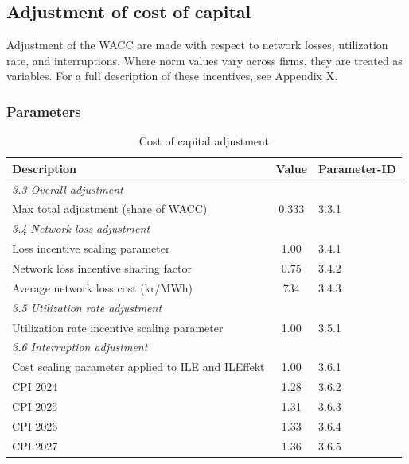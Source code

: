 \subsection{Adjustment of cost of capital}

Adjustment of the WACC are made with respect to network losses, utilization rate, and interruptions.
Where norm values vary across firms, they are treated as variables. For a full description of these incentives, see Appendix X.

\subsubsection{Parameters}

\begin{table}[H]
\centering
\footnotesize
\begin{threeparttable}
\caption{Cost of capital adjustment}
\label{tab:wacc-adj-parameters}
\begin{tabular}{@{}lrrl@{}}
\toprule
\textbf{Description} & \multicolumn{2}{c}{\textbf{Value}} & \textbf{Parameter-ID} \\
\midrule
\multicolumn{4}{l}{\textit{3.3 Overall adjustment}} \\
Max total adjustment (share of WACC)\tnote{a} & \multicolumn{2}{c}{0.333} & 3.3.1 \\
\midrule
\multicolumn{4}{l}{\textit{3.4 Network loss adjustment}} \\
Loss incentive scaling parameter & \multicolumn{2}{c}{1.00} & 3.4.1 \\
Network loss incentive sharing factor\tnote{b} & \multicolumn{2}{c}{0.75} & 3.4.2 \\
Average network loss cost (kr/MWh) & \multicolumn{2}{c}{734} & 3.4.3 \\
\midrule
\multicolumn{4}{l}{\textit{3.5 Utilization rate adjustment}} \\
Utilization rate incentive scaling parameter & \multicolumn{2}{c}{1.00} & 3.5.1 \\
\midrule
\multicolumn{4}{l}{\textit{3.6 Interruption adjustment}} \\
Cost scaling parameter applied to ILE and ILEffekt & \multicolumn{2}{c}{1.00} & 3.6.1 \\
CPI 2024\tnote{c} & \multicolumn{2}{c}{1.28} & 3.6.2 \\
CPI 2025 & \multicolumn{2}{c}{1.31} & 3.6.3 \\
CPI 2026 & \multicolumn{2}{c}{1.33} & 3.6.4 \\
CPI 2027 & \multicolumn{2}{c}{1.36} & 3.6.5 \\

\end{tabular}
\end{threeparttable}
\end{table}

